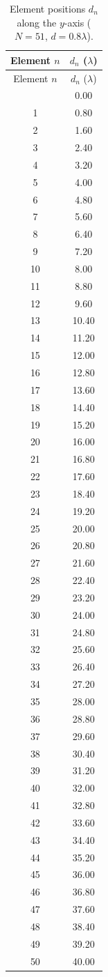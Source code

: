 \begin{longtable}{cc}
\caption{Element positions $d_n$ along the $y$-axis ($N=51$, $d=0.8\lambda$).}\label{tab:d_vector}\\
\toprule
Element $n$ & $d_n$ ($\lambda$) \\
\midrule
\endfirsthead
\toprule
Element $n$ & $d_n$ ($\lambda$) \\
\midrule
\endhead
\bottomrule
\endfoot
0 & 0.00 \\
1 & 0.80 \\
2 & 1.60 \\
3 & 2.40 \\
4 & 3.20 \\
5 & 4.00 \\
6 & 4.80 \\
7 & 5.60 \\
8 & 6.40 \\
9 & 7.20 \\
10 & 8.00 \\
11 & 8.80 \\
12 & 9.60 \\
13 & 10.40 \\
14 & 11.20 \\
15 & 12.00 \\
16 & 12.80 \\
17 & 13.60 \\
18 & 14.40 \\
19 & 15.20 \\
20 & 16.00 \\
21 & 16.80 \\
22 & 17.60 \\
23 & 18.40 \\
24 & 19.20 \\
25 & 20.00 \\
26 & 20.80 \\
27 & 21.60 \\
28 & 22.40 \\
29 & 23.20 \\
30 & 24.00 \\
31 & 24.80 \\
32 & 25.60 \\
33 & 26.40 \\
34 & 27.20 \\
35 & 28.00 \\
36 & 28.80 \\
37 & 29.60 \\
38 & 30.40 \\
39 & 31.20 \\
40 & 32.00 \\
41 & 32.80 \\
42 & 33.60 \\
43 & 34.40 \\
44 & 35.20 \\
45 & 36.00 \\
46 & 36.80 \\
47 & 37.60 \\
48 & 38.40 \\
49 & 39.20 \\
50 & 40.00 \\
\end{longtable}

